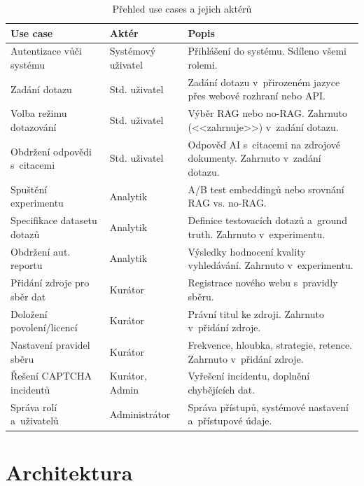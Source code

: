 \documentclass[a4paper, 11pt]{article}
\begin{document}
\begin{table}[H]
\centering\small
\begin{tabularx}{\textwidth}{l l X}
\toprule
\textbf{Use case} & \textbf{Aktér} & \textbf{Popis} \\
\midrule
Autentizace vůči systému & Systémový uživatel & Přihlášení do systému. Sdíleno všemi rolemi. \\
\addlinespace
Zadání dotazu & Std. uživatel & Zadání dotazu v~přirozeném jazyce přes webové rozhraní nebo API. \\
\addlinespace
Volba režimu dotazování & Std. uživatel & Výběr RAG nebo no-RAG. Zahrnuto (<<zahrnuje>>) v~zadání dotazu. \\
\addlinespace
Obdržení odpovědi s~citacemi & Std. uživatel & Odpověď AI s~citacemi na zdrojové dokumenty. Zahrnuto v~zadání dotazu. \\
\addlinespace
Spuštění experimentu & Analytik & A/B test embeddingů nebo srovnání RAG vs. no-RAG. \\
\addlinespace
Specifikace datasetu dotazů & Analytik & Definice testovacích dotazů a~ground truth. Zahrnuto v~experimentu. \\
\addlinespace
Obdržení aut. reportu & Analytik & Výsledky hodnocení kvality vyhledávání. Zahrnuto v~experimentu. \\
\addlinespace
Přidání zdroje pro sběr dat & Kurátor & Registrace nového webu s~pravidly sběru. \\
\addlinespace
Doložení povolení/licencí & Kurátor & Právní titul ke zdroji. Zahrnuto v~přidání zdroje. \\
\addlinespace
Nastavení pravidel sběru & Kurátor & Frekvence, hloubka, strategie, retence. Zahrnuto v~přidání zdroje. \\
\addlinespace
Řešení CAPTCHA incidentů & Kurátor, Admin & Vyřešení incidentu, doplnění chybějících dat. \\
\addlinespace
Správa rolí a~uživatelů & Administrátor & Správa přístupů, systémové nastavení a~přístupové údaje. \\
\bottomrule
\end{tabularx}
\caption{Přehled use cases a jejich aktérů}
\label{tab:usecases}
\end{table}

\newpage
\section{Architektura}
\label{sec:architektura}
\end{document}
